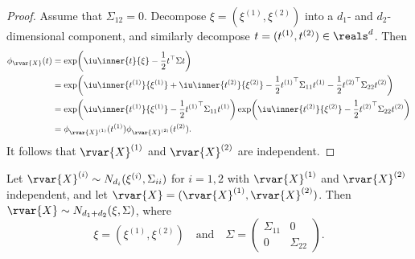\documentclass[article, a4paper, 11pt, oneside]{memoir}
\numberwithin{equation}{chapter}
\begin{document}
\begin{proof}
    Assume that $\Sigma_{12} = 0$. Decompose $\xi = (\xi^{(1)}, \xi^{(2)})$ into a $d_1$- and $d_2$-dimensional component, and similarly decompose $t = (t^{(1)}, t^{(2)}) \in \reals^d$. Then
    \begin{align*}
        \phi_{\rvar{X}}(t)
            &= \exp \biggl( \iu \inner{t}{\xi} - \frac{1}{2} t\trans \Sigma t \biggr) \\
            &= \exp \biggl( \iu \inner{t^{(1)}}{\xi^{(1)}} + \iu \inner{t^{(2)}}{\xi^{(2)}} - \frac{1}{2} {t^{(1)}}\trans \Sigma_{11} t^{(1)} - \frac{1}{2} {t^{(2)}}\trans \Sigma_{22} t^{(2)} \biggr) \\
            &= \exp \biggl( \iu \inner{t^{(1)}}{\xi^{(1)}} - \frac{1}{2} {t^{(1)}}\trans \Sigma_{11} t^{(1)} \biggr)
            \exp \biggl( \iu \inner{t^{(2)}}{\xi^{(2)}} - \frac{1}{2} {t^{(2)}}\trans \Sigma_{22} t^{(2)} \biggr) \\
            &= \phi_{\rvar{X}^{(1)}}(t^{(1)}) \phi_{\rvar{X}^{(2)}}(t^{(2)}).
    \end{align*}
    It follows that $\rvar{X}^{(1)}$ and $\rvar{X}^{(2)}$ are independent.
\end{proof}


\begin{proposition}
    Let $\rvar{X}^{(i)} \sim N_{d_i}(\xi^{(i)},\Sigma_{ii})$ for $i = 1,2$ with $\rvar{X}^{(1)}$ and $\rvar{X}^{(2)}$ independent, and let $\rvar{X} = (\rvar{X}^{(1)}, \rvar{X}^{(2)})$. Then $\rvar{X} \sim N_{d_1 + d_2}(\xi,\Sigma)$, where
    \begin{equation*}
        \xi
            = (\xi^{(1)}, \xi^{(2)})
        \quad \text{and} \quad
        \Sigma =
            \begin{pmatrix}
                \Sigma_{11} & 0 \\
                0           & \Sigma_{22}
            \end{pmatrix}.
    \end{equation*}
\end{proposition}
\end{document}
